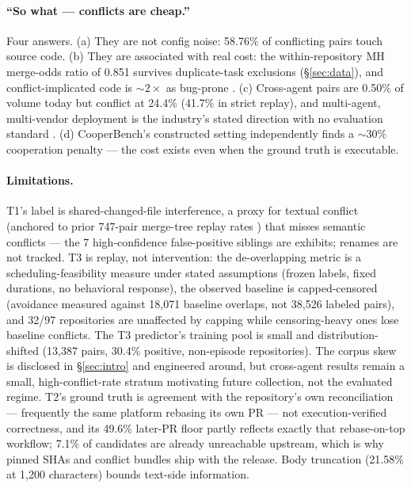 \documentclass{article}
\begin{document}
\paragraph{``So what --- conflicts are cheap.''} Four answers. (a) They are not config noise: 58.76\% of conflicting pairs touch source code. %
(b) They are associated with real cost: the within-repository MH merge-odds ratio of 0.851 survives duplicate-task exclusions (\S\ref{sec:data}), and conflict-implicated code is $\sim 2\times$ as bug-prone \citep{brindescu2020emse}. (c) Cross-agent pairs are 0.50\% of volume today but conflict at 24.4\% (41.7\% in strict replay), and multi-agent, multi-vendor deployment is the industry's stated direction with no evaluation standard \citep{geng2026caid,cognition2025dont}. (d) CooperBench's constructed setting independently finds a $\sim$30\% cooperation penalty \citep{khatua2026cooperbench} --- the cost exists even when the ground truth is executable.

\paragraph{Limitations.} T1's label is shared-changed-file interference, a proxy for textual conflict (anchored to prior 747-pair merge-tree replay rates \citep{xu2026agentprs}) that misses semantic conflicts --- the 7 high-confidence false-positive siblings are exhibits; renames are not tracked. T3 is replay, not intervention: the de-overlapping metric is a scheduling-feasibility measure under stated assumptions (frozen labels, fixed durations, no behavioral response), the observed baseline is capped-censored (avoidance measured against 18{,}071 baseline overlaps, not 38{,}526 labeled pairs), and 32/97 repositories are unaffected by capping while censoring-heavy ones lose baseline conflicts. The T3 predictor's training pool is small and distribution-shifted (13{,}387 pairs, 30.4\% positive, non-episode repositories). The corpus skew is disclosed in \S\ref{sec:intro} and engineered around, but cross-agent results remain a small, high-conflict-rate stratum motivating future collection, not the evaluated regime. T2's ground truth is agreement with the repository's own reconciliation --- frequently the same platform rebasing its own PR --- not execution-verified correctness, and its 49.6\% later-PR floor partly reflects exactly that rebase-on-top workflow; 7.1\% of candidates are already unreachable upstream, which is why pinned SHAs and conflict bundles ship with the release. Body truncation (21.58\% at 1{,}200 characters) bounds text-side information.
\end{document}
